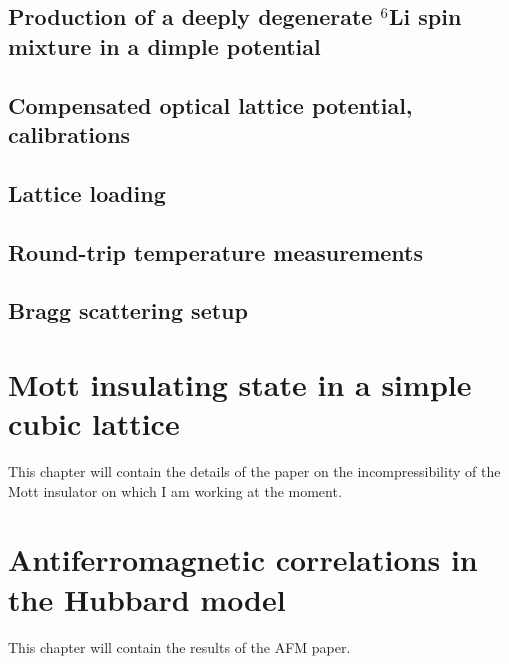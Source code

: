 \documentclass[oneside,11pt]{memoir}
\begin{document}
\section{Production of a deeply degenerate $^{6}$Li spin mixture in a dimple
potential } 

\section{Compensated optical lattice potential, calibrations}

\section{Lattice loading} 

\section{Round-trip temperature measurements}

\section{Bragg scattering setup}  

\chapter{Mott insulating state in a simple cubic lattice} 

This chapter will contain the details of the paper on the incompressibility of
the Mott insulator on which I am working at the moment.  

\chapter{Antiferromagnetic correlations in the Hubbard model}

This chapter will contain the results of the AFM paper.   

\end{document}

